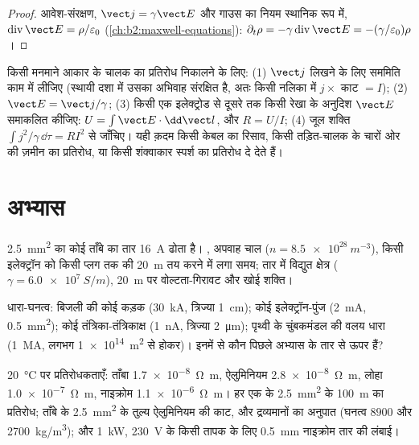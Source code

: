 \begin{proof}
आवेश-संरक्षण, $\vect j = \gamma\vect E$ और गाउस का नियम स्थानिक
रूप में, $\operatorname{div}\vect E = \rho/\varepsilon_0$ (\cref{ch:b2:maxwell-equations}):
$\partial_t\rho = -\gamma\operatorname{div}\vect E = -(\gamma/\varepsilon_0)\rho$।
\end{proof}

\begin{method}[स्थानिक से समाकल नियम तक]\label{met:b2:charges-currents-conduction:method}
किसी मनमाने आकार के चालक का प्रतिरोध निकालने के लिए: (1) $\vect j$ लिखने के लिए
सममिति काम में लीजिए (स्थायी दशा में उसका अभिवाह संरक्षित है, अतः किसी
नलिका में $j \times$ काट $= I$); (2) $\vect E = \vect j/\gamma$; (3) किसी
एक इलेक्ट्रोड से दूसरे तक किसी रेखा के अनुदिश $\vect E$ समाकलित कीजिए: $U = \int\vect E\cdot
\dd\vect l$, और $R = U/I$; (4) जूल शक्ति $\int j^2/\gamma\,
\dd\tau = RI^2$ से जाँचिए। यही क़दम किसी केबल का रिसाव, किसी तड़ित-चालक के
चारों ओर की ज़मीन का प्रतिरोध, या किसी शंक्वाकार स्पर्श का प्रतिरोध दे देते हैं।
\end{method}

\section{अभ्यास}

\begin{exercise}[$\star$]\label{exo:b2:charges-currents-conduction:1}
\qty{2.5}{mm^2} का कोई ताँबे का तार \qty{16}{A} ढोता है। , अपवाह
चाल ($n = \qty{8.5e28}{m^{-3}}$), किसी इलेक्ट्रॉन को किसी प्लग तक की
\qty{20}{m} तय करने में लगा समय; तार में विद्युत क्षेत्र ($\gamma = \qty{6.0e7}{S/m}$),
\qty{20}{m} पर वोल्टता-गिरावट और खोई शक्ति।
\end{exercise}

\begin{exercise}[$\star$]\label{exo:b2:charges-currents-conduction:2}
धारा-घनत्व: बिजली की कोई कड़क (\qty{30}{kA}, त्रिज्या \qty{1}{cm}); कोई
इलेक्ट्रॉन-पुंज (\qty{2}{mA}, \qty{0.5}{mm^2}); कोई तंत्रिका-तंत्रिकाक्ष (\qty{1}{nA}, त्रिज्या
\qty{2}{\micro m}); पृथ्वी के चुंबकमंडल की वलय धारा (\qty{1}{MA}, लगभग
\qty{1e14}{m^2} से होकर)। इनमें से कौन पिछले अभ्यास के तार से ऊपर हैं?
\end{exercise}

\begin{exercise}[$\star$]\label{exo:b2:charges-currents-conduction:3}
\qty{20}{\degreeCelsius} पर प्रतिरोधकताएँ: ताँबा \qty{1.7e-8}{\ohm.m}, ऐलुमिनियम
\qty{2.8e-8}{\ohm.m}, लोहा \qty{1.0e-7}{\ohm.m}, नाइक्रोम \qty{1.1e-6}{\ohm.m}।
हर एक के \qty{2.5}{mm^2} के \qty{100}{m} का प्रतिरोध; ताँबे के \qty{2.5}{mm^2} के तुल्य
ऐलुमिनियम की काट, और द्रव्यमानों का अनुपात (घनत्व
$8900$ और \qty{2700}{kg/m^3}); और \qty{1}{kW}, \qty{230}{V} के किसी तापक के लिए
\qty{0.5}{mm} नाइक्रोम तार की लंबाई।
\end{exercise}

